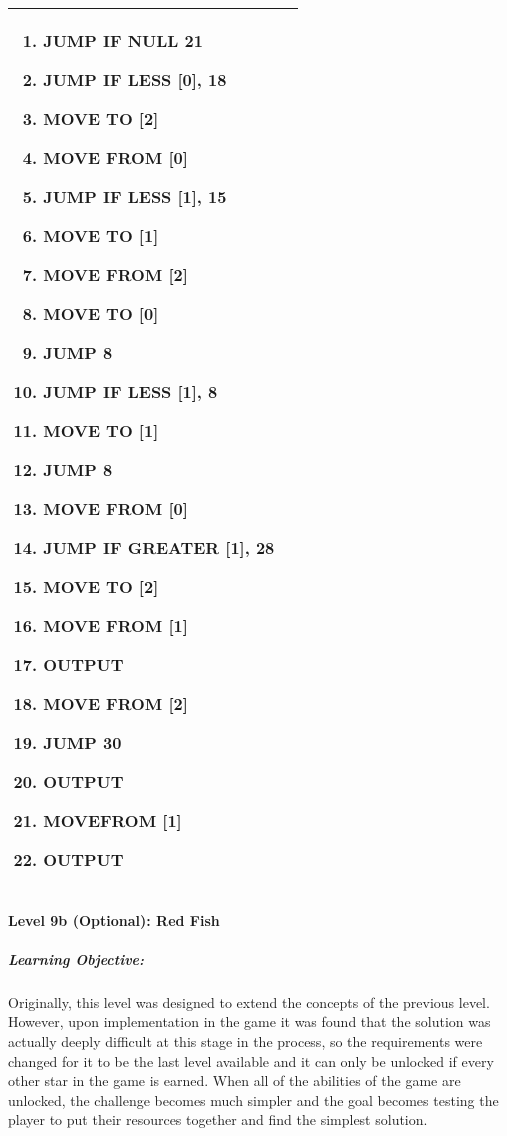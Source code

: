 \begin{center}
\begin{tabular}{ | m{6cm} | m{8cm} | }
\begin{enumerate}
                \item JUMP IF NULL 21
                \item JUMP IF LESS [0], 18
                \item MOVE TO [2]
                \item MOVE FROM [0]
		\item JUMP IF LESS [1], 15
                \item MOVE TO [1]
                \item MOVE FROM [2]
                \item MOVE TO [0]
                \item JUMP 8
                \item JUMP IF LESS [1], 8
                \item MOVE TO [1]
                \item JUMP 8
                \item MOVE FROM [0]
		\item JUMP IF GREATER [1], 28
		\item MOVE TO [2]
		\item MOVE FROM [1]
		\item OUTPUT
		\item MOVE FROM [2]
		\item JUMP 30
                \item OUTPUT
                \item MOVEFROM [1]
                \item OUTPUT
            \end{enumerate}
            \\
        \hline
    \end{tabular}
\end{center}


\paragraph{Level 9b (Optional): Red Fish}
\subparagraph{Learning Objective:} Originally, this level was designed to extend the concepts of the previous level. However, upon implementation in the game it was found that the solution was actually deeply difficult at this stage in the process, so the requirements were changed for it to be the last level available and it can only be unlocked if every other star in the game is earned. When all of the abilities of the game are unlocked, the challenge becomes much simpler and the goal becomes testing the player to put their resources together and find the simplest solution.

